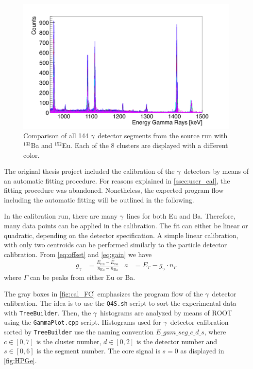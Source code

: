 \documentclass[twoside,english]{uiofysmaster/uiofysmaster}
\newcommand{\ga}{$\gamma$}
\let\orgautoref\autoref
\renewcommand{\autoref}
        {%
		 \def\sectionautorefname{Section}%
		 \def\subsectionautorefname{Section}%
		 \def\subsubsectionautorefname{Section}%
		 \def\chapterautorefname{Chapter}%
          \orgautoref}
\begin{document}
\begin{figure}[ht]
	\centering
	\includegraphics[width=\textwidth]{../Plots/comparing/gamma_comparison_full.png}
	\caption{Comparison of all 144 \ga\ detector segments from the source run with $^{133}$Ba and $^{152}$Eu. 
	Each of the 8 clusters are displayed with a different color.}
	\label{fig:gamma_comparison}
\end{figure}

The original thesis project included the calibration of the \ga\ detectors by means of an automatic fitting procedure.
For reasons explained in \autoref{ssec:user_cal}, the fitting procedure was abandoned.
Nonetheless, the expected program flow including the automatic fitting will be outlined in the following.

In the calibration run, there are many \ga\ lines for both Eu and Ba. 
Therefore, many data points can be applied in the calibration.
The fit can either be linear or quadratic, depending on the detector specification.
A simple linear calibration, with only two centroids can be performed similarly to the particle detector calibration.
From \autoref{eq:offset} and \autoref{eq:gain} we have
\begin{align}\label{eq:GGandA}
	g_\gamma &= \frac{E_{\text{Eu}} - E_{\text{Ba}}}{n_{\text{Eu}} - n_{\text{Ba}}} 
	&  
	a &= E_{\Gamma} - g_\gamma \cdot n_{\Gamma}
\end{align}
where $\Gamma$ can be peaks from either Eu or Ba.

The gray boxes in \autoref{fig:cal_FC} emphasizes the program flow of the \ga\ detector calibration. 
The idea is to use the \texttt{Q4S.sh} script to sort the experimental data with \texttt{TreeBuilder}.
Then, the \ga\ histograms are analyzed by means of ROOT using the \texttt{GammaPlot.cpp} script.
Histograms used for \ga\ detector calibration sorted by \texttt{TreeBuilder} use the naming convention $\textit{E\_gam\_seg}\_c\_d\_s$, where $c \in [0, 7]$ is the cluster number, $d \in [0, 2]$ is the detector number and $s \in [0, 6]$ is the segment number.
The core signal is $s = 0$ as displayed in \autoref{fig:HPGe}.
\end{document}
